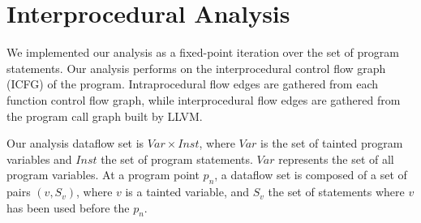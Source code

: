 \section{Interprocedural Analysis}\label{analysis}

We implemented our analysis as a fixed-point iteration
over the set of program statements. Our analysis performs
on the interprocedural control flow graph (ICFG) of the program.
Intraprocedural flow edges are gathered from each function
control flow graph, while interprocedural flow edges are
gathered from the program call graph built by LLVM. 

Our analysis dataflow set is $\mathit{Var} \times \mathit{Inst}$,
where $\mathit{Var}$ is the set of tainted program
variables and $\mathit{Inst}$ the set of program statements. 
$Var$ represents the set of all program variables.
At a program point $p_n$, a dataflow set is composed
of a set of pairs $(v, S_v)$, where $v$ is a tainted
variable, and $S_v$ the set of statements where $v$
has been used before the $p_n$.
 
